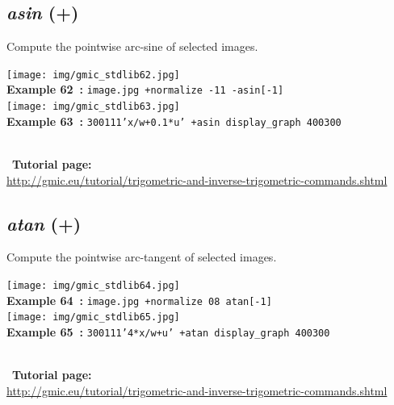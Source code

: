 \documentclass[a4paper,10.5pt,twoside]{book}
\def\comma{\discretionary{,}{}{,}}
\begin{document}
\subsection{\emph{asin} (+)}\vspace*{-0.7em}
Compute the pointwise arc-sine of selected images.
\begin{center}\texttt{[image: img/gmic\_stdlib62.jpg]}\\
{\footnotesize \textbf{Example 62~:} \texttt{image.jpg +normalize -1{\comma}1 -asin[-1]}}
\\\texttt{[image: img/gmic\_stdlib63.jpg]}\\
{\footnotesize \textbf{Example 63~:} \texttt{300{\comma}1{\comma}1{\comma}1{\comma}'x/w+0.1*u' +asin display\_graph 400{\comma}300}}
\end{center}
~\\
~\textbf{Tutorial page: }\\\url{http://gmic.eu/tutorial/trigometric-and-inverse-trigometric-commands.shtml}


\subsection{\emph{atan} (+)}\vspace*{-0.7em}
Compute the pointwise arc-tangent of selected images.
\begin{center}\texttt{[image: img/gmic\_stdlib64.jpg]}\\
{\footnotesize \textbf{Example 64~:} \texttt{image.jpg +normalize 0{\comma}8 atan[-1]}}
\\\texttt{[image: img/gmic\_stdlib65.jpg]}\\
{\footnotesize \textbf{Example 65~:} \texttt{300{\comma}1{\comma}1{\comma}1{\comma}'4*x/w+u' +atan display\_graph 400{\comma}300}}
\end{center}
~\\
~\textbf{Tutorial page: }\\\url{http://gmic.eu/tutorial/trigometric-and-inverse-trigometric-commands.shtml}
\end{document}
